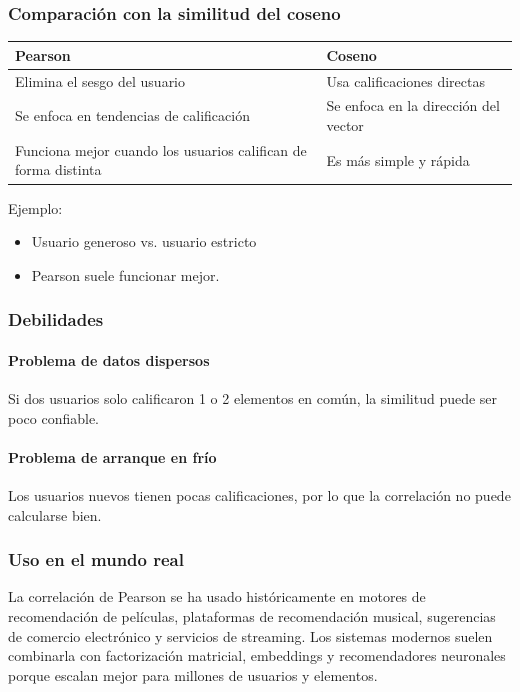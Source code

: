 \documentclass[12pt]{article}
\begin{document}
\subsubsection*{Comparación con la similitud del coseno}
\begin{center}
\begin{tabular}{|>{\raggedright\arraybackslash}p{5.7cm}|>{\raggedright\arraybackslash}p{5.7cm}|}
\hline
Pearson & Coseno \\
\hline
Elimina el sesgo del usuario & Usa calificaciones directas \\
Se enfoca en tendencias de calificación & Se enfoca en la dirección del vector \\
Funciona mejor cuando los usuarios califican de forma distinta & Es más simple y rápida \\
\hline
\end{tabular}
\end{center}

Ejemplo:
\begin{itemize}
\item Usuario generoso vs. usuario estricto
\item Pearson suele funcionar mejor.
\end{itemize}

\subsubsection*{Debilidades}
\paragraph{Problema de datos dispersos} Si dos usuarios solo calificaron 1 o 2 elementos en común, la similitud puede ser poco confiable.

\paragraph{Problema de arranque en frío} Los usuarios nuevos tienen pocas calificaciones, por lo que la correlación no puede calcularse bien.

\subsubsection*{Uso en el mundo real}
La correlación de Pearson se ha usado históricamente en motores de recomendación de películas, plataformas de recomendación musical, sugerencias de comercio electrónico y servicios de streaming. Los sistemas modernos suelen combinarla con factorización matricial, embeddings y recomendadores neuronales porque escalan mejor para millones de usuarios y elementos.
\end{document}
